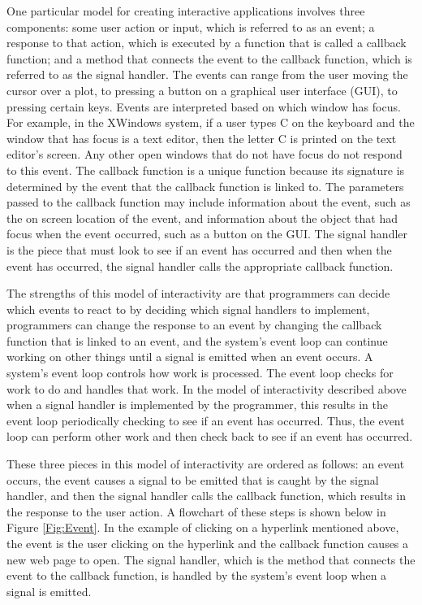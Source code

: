 \documentclass{article}[11pt]
\begin{document}
One particular model for creating interactive applications involves three
components: some user action or input, which is referred to as an event;
a response to that action, which is executed by a function that is called
a callback function; and a method that connects the event to the callback
function, which is referred to as the signal handler.  The events can
range from the user moving the cursor over a plot, to pressing a button on a
graphical user interface (GUI), to pressing certain keys.  Events are
interpreted based on which window has focus.  For example, in the XWindows
system, if a user types C on the keyboard and the window that has focus is a
text editor, then the letter C is printed on the text editor's screen.
Any other open windows that do not have focus do not respond to this event.
The callback function is a unique function because its signature is determined
by the event that the callback function is linked to.  The parameters passed
to the callback function may include information about the event, such as the
on screen location of the event, and information about the object that had
focus when the event occurred, such as a button on the GUI.  The signal
handler is the piece that must look to see if an event has occurred and then
when the event has occurred, the signal handler calls the appropriate callback
function. 

The strengths of this model of interactivity are that programmers can decide
which events to react to by deciding which signal handlers to implement,
programmers can change the response to an event by changing the callback
function that is linked to an event, and the system's event loop can continue
working on other things until a signal is emitted when an event occurs.  A
system's event loop controls how work is processed.  The event loop checks for
work to do and handles that work.  In the model of interactivity described
above when a signal handler is implemented by the programmer, this results in
the event loop periodically checking to see if an event has occurred.  Thus,
the event loop can perform other work and then check back to see if an event
has occurred.

These three pieces in this model of interactivity are ordered as follows:
an event occurs, the event causes a signal to be emitted that is caught by the
signal handler, and then the signal handler calls the callback function, which
results in the response to the user action.  A flowchart of these steps is
shown below in Figure \ref{Fig:Event}.  In the example of clicking on a
hyperlink mentioned above, the event is the user clicking on the
hyperlink and the callback function causes a new web page to open.
The signal handler, which is the method that connects the event to the
callback function, is handled by the system's event loop when a signal is
emitted. 
\end{document}
